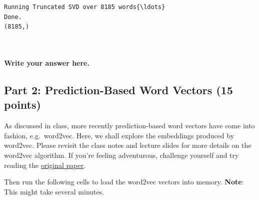 \documentclass[18pt]{article}
\begin{document}
    \begin{Verbatim}[commandchars=\\\{\}]
Running Truncated SVD over 8185 words{\ldots}
Done.
(8185,)

    \end{Verbatim}

    \begin{center}
    \end{center}
    { \hspace*{\fill} \\}
    
    \hypertarget{write-your-answer-here.}{%
\paragraph{Write your answer here.}\label{write-your-answer-here.}}

    \hypertarget{part-2-prediction-based-word-vectors-15-points}{%
\subsection{Part 2: Prediction-Based Word Vectors (15
points)}\label{part-2-prediction-based-word-vectors-15-points}}

As discussed in class, more recently prediction-based word vectors have
come into fashion, e.g.~word2vec. Here, we shall explore the embeddings
produced by word2vec. Please revisit the class notes and lecture slides
for more details on the word2vec algorithm. If you're feeling
adventurous, challenge yourself and try reading the
\href{https://papers.nips.cc/paper/5021-distributed-representations-of-words-and-phrases-and-their-compositionality.pdf}{original
paper}.

Then run the following cells to load the word2vec vectors into memory.
\textbf{Note}: This might take several minutes.
\end{document}
